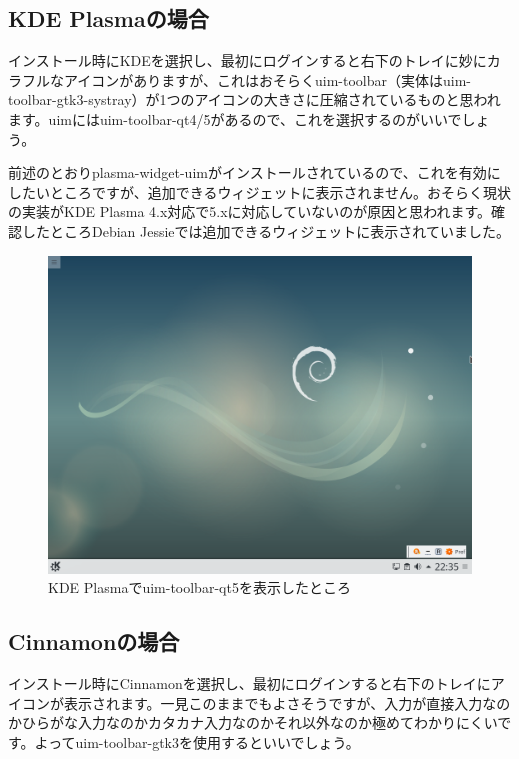\documentclass[mingoth,a4paper]{jsarticle}
\begin{document}
\pagebreak
\subsection{KDE Plasmaの場合}

インストール時にKDEを選択し、最初にログインすると右下のトレイに妙にカラフルなアイコンがありますが、これはおそらくuim-toolbar（実体はuim-toolbar-gtk3-systray）が1つのアイコンの大きさに圧縮されているものと思われます。uimにはuim-toolbar-qt4/5があるので、これを選択するのがいいでしょう。

前述のとおりplasma-widget-uimがインストールされているので、これを有効にしたいところですが、追加できるウィジェットに表示されません。おそらく現状の実装がKDE
Plasma
4.x対応で5.xに対応していないのが原因と思われます。確認したところDebian
Jessieでは追加できるウィジェットに表示されていました。

\begin{figure}[htbp!]
  \centering
  \includegraphics[width=\linewidth]{image201708/kde-uim-toolbar-qt5.png}
  \caption{KDE Plasmaでuim-toolbar-qt5を表示したところ}
\end{figure}

\pagebreak
\subsection{Cinnamonの場合}

インストール時にCinnamonを選択し、最初にログインすると右下のトレイにアイコンが表示されます。一見このままでもよさそうですが、入力が直接入力なのかひらがな入力なのかカタカナ入力なのかそれ以外なのか極めてわかりにくいです。よってuim-toolbar-gtk3を使用するといいでしょう。
\end{document}

